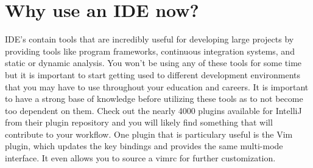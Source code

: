 \documentclass{article}
\begin{document}
\section{Why use an IDE now?}
IDE's contain tools that are incredibly useful for developing large projects by providing tools like program frameworks,
continuous integration systems, and static or dynamic analysis. You won't be using any of these tools for some time but
it is important to start getting used to different development environments that you may have to use throughout your
education and careers. It is important to have a strong base of knowledge before utilizing these tools as to not become
too dependent on them. Check out the nearly 4000 plugins available for IntelliJ from their plugin repository and you
will likely find something that will contribute to your workflow. One plugin that is particulary useful is the Vim plugin,
which updates the key bindings and provides the same multi-mode interface. It even allows you to source a vimrc for further
customization.
\end{document}
